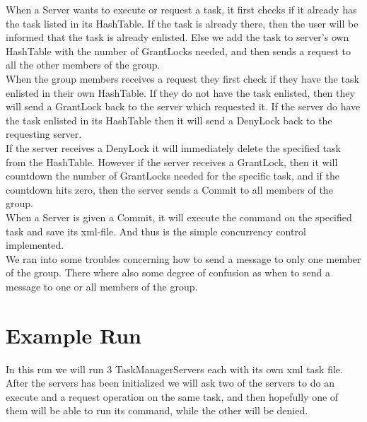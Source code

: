 When a Server wants to execute or request a task, it first checks if it already has the task listed in its HashTable. If the task is already there, then the user will be informed that the task is already enlisted. Else we add the task to server's own HashTable with the number of GrantLocks needed, and then sends a request to all the other members of the group. \\

When the group members receives a request they first check if they have the task enlisted in their own HashTable. If they do not have the task enlisted, then they will send a GrantLock back to the server which requested it. If the server do have the task enlisted in its HashTable then it will send a DenyLock back to the requesting server. \\

If the server receives a DenyLock it will immediately delete the specified task from the HashTable. However if the server receives a GrantLock, then it will countdown the number of GrantLocks needed for the specific task, and if the countdown hits zero, then the server sends a Commit to all members of the group. \\

When a Server is given a Commit, it will execute the command on the specified task and save its xml-file. And thus is the simple concurrency control implemented. \\

We ran into some troubles concerning how to send a message to only one member of the group. There where also some degree of confusion as when to send a message to one or all members of the group. \\


\section{Example Run}
\label{MutualExclusion_run}

In this run we will run 3 TaskManagerServers each with its own xml task file. After the servers has been initialized we will ask two of the servers to do an execute and a request operation on the same task, and then hopefully one of them will be able to run its command, while the other will be denied. \\


